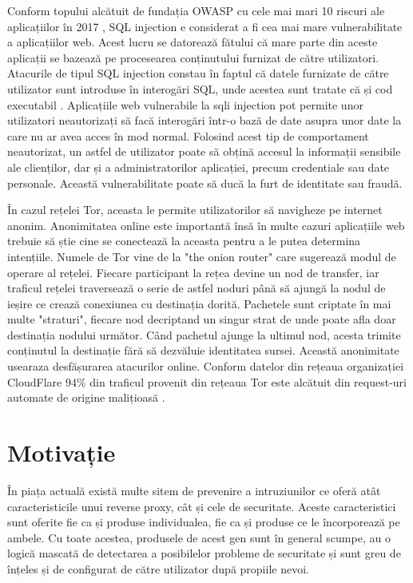  Conform topului alcătuit de fundația OWASP cu cele mai mari 10 riscuri ale aplicațiilor în 2017 \cite{owasp}, SQL injection e considerat a fi cea mai mare vulnerabilitate a aplicațiilor web. Acest lucru se datorează fătului că mare parte din aceste aplicații se bazează pe procesearea conținutului furnizat de către utilizatori. Atacurile de tipul SQL injection constau în faptul că datele furnizate de către utilizator sunt introduse în interogări SQL, unde acestea sunt tratate că și cod executabil \cite{classification_and_countermeasures}. Aplicațiile web vulnerabile la sqli injection pot permite unor utilizatori neautorizați să facă interogări într-o bază de date asupra unor date la care nu ar avea acces în mod normal. Folosind acest tip de comportament neautorizat, un astfel de utilizator poate să obțină accesul la informații sensibile ale clienților, dar și a administratorilor aplicației, precum credentiale sau date personale. Această vulnerabilitate poate să ducă la furt de identitate sau fraudă.  
 
În cazul rețelei Tor, aceasta le permite utilizatorilor să navigheze pe internet anonim. Anonimitatea online este importantă însă în multe cazuri aplicațiile web trebuie să știe cine se conectează la aceasta pentru a le putea determina intențiile. Numele de Tor vine de la "the onion router" care sugerează modul de operare al rețelei. Fiecare participant la rețea devine un nod de transfer, iar traficul rețelei traversează o serie de astfel noduri până să ajungă la nodul de ieșire ce crează conexiunea cu destinația dorită. Pachetele sunt criptate în mai multe "straturi", fiecare nod decriptand un singur strat de unde poate afla doar destinația nodului următor. Când pachetul ajunge la ultimul nod, acesta trimite conținutul la destinație fără să dezvăluie identitatea sursei. Această anonimitate usearaza desfășurarea atacurilor online. Conform datelor din rețeaua organizației CloudFlare 94\% din traficul provenit din rețeaua Tor este alcătuit din request-uri automate de origine malițioasă \cite{tor_trouble}. 

 \section{Motivație}
În piața actuală există multe sitem de prevenire a intruziunilor ce oferă atât caracteristicile unui reverse proxy, cât și cele de securitate. Aceste caracteristici sunt oferite fie ca și produse individualea, fie ca și produse ce le încorporează pe ambele. Cu toate acestea, produsele de acest gen sunt în general scumpe, au o logică mascată de detectarea a posibilelor probleme de securitate și sunt greu de înțeles și de configurat de către utilizator după propiile nevoi. 

